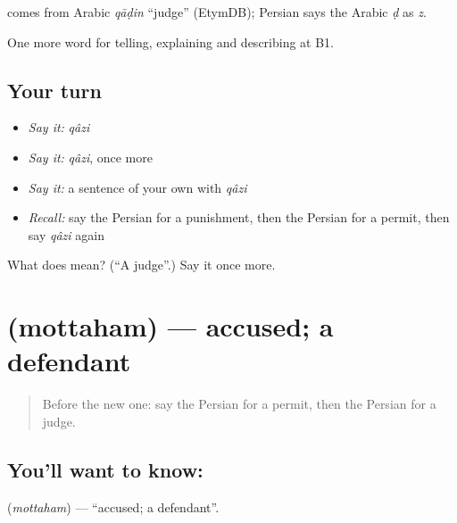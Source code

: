 \begin{cousinweb}
\textbf{} comes from Arabic \emph{qāḍin} \textquotedblleft{}judge\textquotedblright{} (EtymDB); Persian says the Arabic \emph{ḍ} as \emph{z}.
\end{cousinweb}

\begin{grammarlens}[title={What you've built}]
One more word for telling, explaining and describing at B1.
\end{grammarlens}

\subsection*{Your turn}
\begin{itemize}
\raggedright
  \item \emph{Say it:} \emph{qâzi}
  \item \emph{Say it:} \emph{qâzi}, once more
  \item \emph{Say it:} a sentence of your own with \emph{qâzi}
  \item \emph{Recall:} say the Persian for a punishment, then the Persian for a permit, then say \emph{qâzi} again
\end{itemize}

\begin{tcolorbox}[breakable,colback=teal!4,colframe=teal!35!black,title={Before you move on}]
What does  mean? (\textquotedblleft{}A judge\textquotedblright{}.) Say it once more.
\end{tcolorbox}
\section[\texorpdfstring{\fa{متهم} (mottaham)}{متهم (mottaham)}]{ (mottaham) — accused; a defendant}

\label{lesson:FA-C406-mottaham}



\begin{quote}
Before the new one: say the Persian for a permit, then the Persian for a judge.
\end{quote}

\subsection*{You'll want to know: }
\textbf{} (\emph{mottaham}) — \textquotedblleft{}accused; a defendant\textquotedblright{}.

